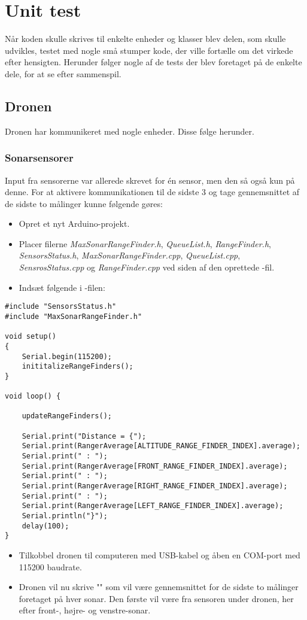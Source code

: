 \documentclass[Main]{subfiles}
\begin{document}
\chapter{Unit test}
Når koden skulle skrives til enkelte enheder og klasser blev delen, som skulle udvikles, testet med nogle små stumper kode, der ville fortælle om det virkede efter hensigten.
Herunder følger nogle af de tests der blev foretaget på de enkelte dele, for at se efter sammenspil.

\section{Dronen}
Dronen har kommunikeret med nogle enheder.
Disse følge herunder.

\subsection{Sonarsensorer}
Input fra sensorerne var allerede skrevet for én sensor, men den så også kun på denne.
For at aktivere kommunikationen til de sidste 3 og tage gennemsnittet af de sidste to målinger kunne følgende gøres:

\begin{itemize}
\item Opret et nyt Arduino-projekt.
\item Placer filerne \textit{MaxSonarRangeFinder.h}, \textit{QueueList.h}, \textit{RangeFinder.h}, \textit{SensorsStatus.h}, \textit{MaxSonarRangeFinder.cpp}, \textit{QueueList.cpp}, \textit{SensrosStatus.cpp} og \textit{RangeFinder.cpp} ved siden af den oprettede -fil.
\item Indsæt følgende i -filen:
\end{itemize}


\begin{lstlisting}[caption=Udskrift af sensorgennemsnit, style=Code-C, label=lst:ref]
#include "SensorsStatus.h"
#include "MaxSonarRangeFinder.h"

void setup() 
{
	Serial.begin(115200);
	inititalizeRangeFinders();
}

void loop() {
  
	updateRangeFinders();
  
	Serial.print("Distance = {");
	Serial.print(RangerAverage[ALTITUDE_RANGE_FINDER_INDEX].average);
	Serial.print(" : ");
	Serial.print(RangerAverage[FRONT_RANGE_FINDER_INDEX].average);
	Serial.print(" : ");
	Serial.print(RangerAverage[RIGHT_RANGE_FINDER_INDEX].average);
	Serial.print(" : ");
	Serial.print(RangerAverage[LEFT_RANGE_FINDER_INDEX].average);
	Serial.println("}");
	delay(100);
}
\end{lstlisting}
\begin{itemize}
\item Tilkobbel dronen til computeren med USB-kabel og åben en COM-port med 115200 baudrate.
\item Dronen vil nu skrive ""\xspace som vil være gennemsnittet for de sidste to målinger foretaget på hver sonar.
Den første vil være fra sensoren under dronen, her efter front-, højre- og venstre-sonar.
\end{itemize}
\end{document}
